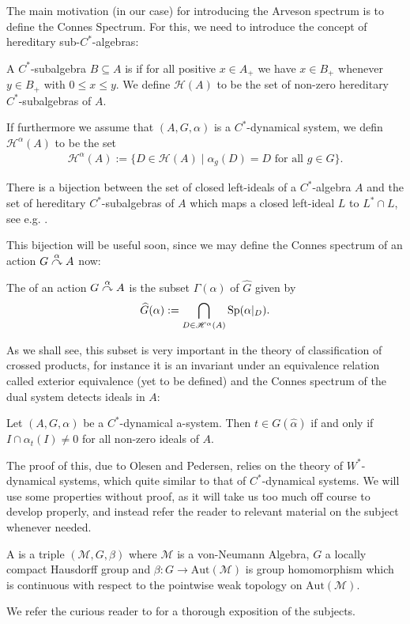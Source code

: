 The main motivation (in our case) for introducing the Arveson spectrum is to define the Connes Spectrum. For this, we need to introduce the concept of hereditary sub-$C^*$-algebras:
\begin{definition}
	A $C^*$-subalgebra $B\subseteq A$ is  if for all positive $x \in A_+$ we have $x \in B_+$ whenever $y \in B_+$ with $0 \leq x \leq y$. We define $\mathscr{H}(A)$ to be the set of non-zero hereditary $C^*$-subalgebras of $A$. 
	
	If furthermore we assume that $(A, G, \alpha)$ is a $C^*$-dynamical system, we defin $\mathscr{H}^\alpha(A)$ to be the set
	\begin{align*}
		\mathscr{H}^\alpha (A) := \{ D \in \mathscr{H}(A) \mid \alpha_g(D)=D \text{ for all } g \in G\}.
	\end{align*}
\end{definition}
\begin{remark}
	There is a bijection between the set of closed left-ideals of a $C^*$-algebra $A$ and the set of hereditary $C^*$-subalgebras of $A$ which maps a closed left-ideal $L$ to $L^* \cap L$, see e.g. \cite[II.5.3.2]{blackadar}.
\end{remark}
This bijection will be useful soon, since we may define the Connes spectrum of an action $G \stackrel{\alpha}{\curvearrowright} A$ now:
\begin{definition}
	The  of an action $G \stackrel{\alpha}{\curvearrowright} A$ is the subset $\Gamma(\alpha)$ of $\hat G$ given by
	\begin{align*}
		\widehat{G} ( \alpha) := \bigcap_{D \in \mathscr{H}^\alpha (A)} \mathrm{Sp}(\alpha|_D).
	\end{align*}
\end{definition}
As we shall see, this subset is very important in the theory of classification of crossed products, for instance it is an invariant under an equivalence relation called exterior equivalence (yet to be defined) and the Connes spectrum of the dual system detects ideals in $A$:
\begin{lemma}
	Let $(A, G, \alpha)$ be a $C^*$-dynamical a-system. Then $t \in G(\hat \alpha)$ if and only if $I \cap \alpha_t(I) \neq 0$ for all non-zero ideals of $A$.
\end{lemma}
\begin{remark}
	The proof of this, due to Olesen and Pedersen, relies on the theory of $W^*$-dynamical systems, which quite similar to that of $C^*$-dynamical systems. We will use some properties without proof, as it will take us too much off course to develop properly, and instead refer the reader to relevant material on the subject whenever needed.	
\begin{definition}
	A  is a triple $(\mathscr{M},G,\beta)$ where $\mathscr{M}$ is a von-Neumann Algebra, $G$ a locally compact Hausdorff group and $\beta \colon G \to \mathrm{Aut}(\mathscr{M})$ is group homomorphism which is continuous with respect to the pointwise weak topology on $\mathrm{Aut}(\mathscr{M})$.
\end{definition}
	 We refer the curious reader to \cite[Chapter 7.4 and 7.10]{pedersenalgauto} for a thorough exposition of the subjects.
\end{remark}

